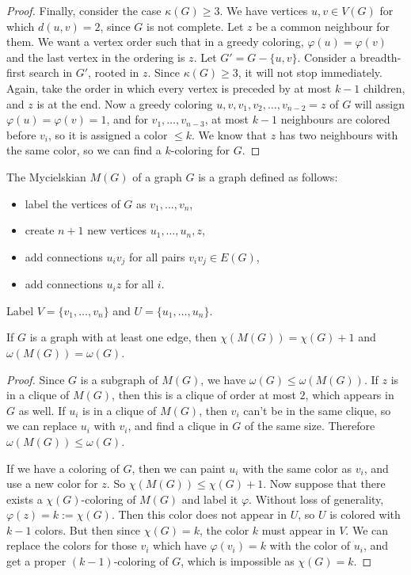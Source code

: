 \begin{proof}
  Finally, consider the case $\kappa(G) \ge 3$.
  We have vertices $u,v \in V(G)$ for which $d(u,v) = 2$, since $G$ is not
  complete.
  Let $z$ be a common neighbour for them.
  We want a vertex order such that in a greedy coloring, $\varphi(u) =
  \varphi(v)$ and the last vertex in the ordering is $z$.
  Let $G' = G - \{u,v\}$.
  Consider a breadth-first search in $G'$, rooted in $z$.
  Since $\kappa(G) \ge 3$, it will not stop immediately.
  Again, take the order in which every vertex is preceded by at most $k-1$
  children, and $z$ is at the end.
  Now a greedy coloring $u, v, v_1, v_2, \ldots, v_{n-2}=z$ of $G$ will assign
  $\varphi(u) = \varphi(v) = 1$, and for $v_1, \ldots, v_{n-3}$, at most $k-1$
  neighbours are colored before $v_i$, so it is assigned a color $\le k$.
  We know that $z$ has two neighbours with the same color, so we can find a
  $k$-coloring for $G$.
\end{proof}



The Mycielskian $M(G)$ of a graph $G$ is a graph defined as follows:
\begin{itemize}
\item label the vertices of $G$ as $v_1, \ldots, v_n$,
\item create $n+1$ new vertices $u_1, \ldots, u_n, z$,
\item add connections $u_i v_j$ for all pairs $v_i v_j \in E(G)$,
\item add connections $u_i z$ for all $i$.
\end{itemize}
Label $V = \{v_1, \ldots, v_n\}$ and $U = \{u_1, \ldots, u_n\}$.

\begin{theorem}
  If $G$ is a graph with at least one edge, then $\chi(M(G)) = \chi(G) + 1$ and
  $\omega(M(G)) = \omega(G)$.
\end{theorem}

\begin{proof}
  Since $G$ is a subgraph of $M(G)$, we have $\omega(G) \le \omega(M(G))$.
  If $z$ is in a clique of $M(G)$, then this is a clique of order at most $2$,
  which appears in $G$ as well.
  If $u_i$ is in a clique of $M(G)$, then $v_i$ can't be in the same clique, so
  we can replace $u_i$ with $v_i$, and find a clique in $G$ of the same size.
  Therefore $\omega(M(G)) \le \omega(G)$.

  If we have a coloring of $G$, then we can paint $u_i$ with the same color as
  $v_i$, and use a new color for $z$.
  So $\chi(M(G)) \le \chi(G)+1$.
  Now suppose that there exists a $\chi(G)$-coloring of $M(G)$ and label it
  $\varphi$.
  Without loss of generality, $\varphi(z) = k := \chi(G)$.
  Then this color does not appear in $U$, so $U$ is colored with $k-1$ colors.
  But then since $\chi(G) = k$, the color $k$ must appear in $V$.
  We can replace the colors for those $v_i$ which have $\varphi(v_i) = k$ with
  the color of $u_i$, and get a proper $(k-1)$-coloring of $G$, which is
  impossible as $\chi(G) = k$.
  \protislovje{}
\end{proof}

